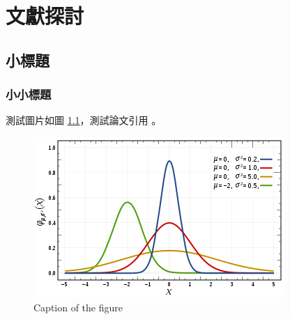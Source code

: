 \chapter{文獻探討}

\section{小標題}

\subsection{小小標題}

測試圖片如圖 \ref{figure:figure_1}，測試論文引用 \cite{Rowe:2005:ASR}。

\begin{figure}[h]
        \centering
        \includegraphics[width=\textwidth]{figures/gambar.png}
        \caption{Caption of the figure}
        \label{figure:figure_1}
\end{figure}
